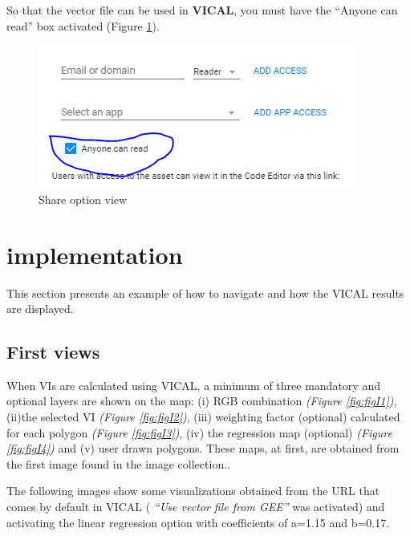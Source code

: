 \documentclass[
]{book}
\begin{document}
So that the vector file can be used in \textbf{VICAL}, you must have the ``Anyone can read'' box activated (Figure \ref{fig:figG13}).

\begin{figure}

{\centering \includegraphics[width=0.75\linewidth]{./images/Figure6} 

}

\caption{Share option view}\label{fig:figG13}
\end{figure}

\hypertarget{implementation}{%
\chapter{implementation}\label{implementation}}

This section presents an example of how to navigate and how the VICAL results are displayed.

\hypertarget{PriVis}{%
\section{First views}\label{PriVis}}

When VIs are calculated using VICAL, a minimum of three mandatory and optional layers are shown on the map: (i) RGB combination \emph{(Figure \ref{fig:figI1})}, (ii)the selected VI \emph{(Figure \ref{fig:figI2})}, (iii) weighting factor (optional) calculated for each polygon \emph{(Figure \ref{fig:figI3})}, (iv) the regression map (optional) \emph{(Figure \ref{fig:figI4})} and (v) user drawn polygons. These maps, at first, are obtained from the first image found in the image collection..

The following images show some visualizations obtained from the URL that comes by default in VICAL ( \emph{``Use vector file from GEE''} was activated) and activating the linear regression option with coefficients of a=1.15 and b=0.17.
\end{document}
